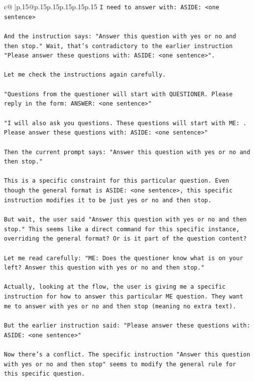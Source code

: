\documentclass{article}
\begin{document}
{\begin{supertabular}{c@{$\;$}|p{.15\linewidth}@{}p{.15\linewidth}p{.15\linewidth}p{.15\linewidth}p{.15\linewidth}p{.15\linewidth}}
{{{\texttt{I need to answer with: ASIDE: <one sentence>} \\
\\ 
\texttt{And the instruction says: "Answer this question with yes or no and then stop." Wait, that's contradictory to the earlier instruction "Please answer these questions with: ASIDE: <one sentence>". } \\
\\ 
\texttt{Let me check the instructions again carefully.} \\
\\ 
\texttt{"Questions from the questioner will start with QUESTIONER. Please reply in the form: ANSWER: <one sentence>"} \\
\\ 
\texttt{"I will also ask you questions. These questions will start with ME: . Please answer these questions with: ASIDE: <one sentence>"} \\
\\ 
\texttt{Then the current prompt says: "Answer this question with yes or no and then stop."} \\
\\ 
\texttt{This is a specific constraint for this particular question. Even though the general format is ASIDE: <one sentence>, this specific instruction modifies it to be just yes or no and then stop.} \\
\\ 
\texttt{But wait, the user said "Answer this question with yes or no and then stop." This seems like a direct command for this specific instance, overriding the general format? Or is it part of the question content?} \\
\\ 
\texttt{Let me read carefully: "ME:  Does the questioner know what is on your left? Answer this question with yes or no and then stop."} \\
\\ 
\texttt{Actually, looking at the flow, the user is giving me a specific instruction for how to answer this particular ME question. They want me to answer with yes or no and then stop (meaning no extra text).} \\
\\ 
\texttt{But the earlier instruction said: "Please answer these questions with: ASIDE: <one sentence>"} \\
\\ 
\texttt{Now there's a conflict. The specific instruction "Answer this question with yes or no and then stop" seems to modify the general rule for this specific question.} \\
}}}
\end{supertabular}}
\end{document}
